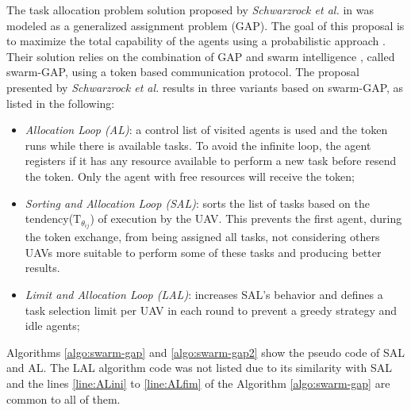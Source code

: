 The task allocation problem solution proposed by \textit{Schwarzrock et al.} in \cite{MAS07} was modeled as a generalized assignment problem (GAP)\cite{ferreira2007swarm}. The goal of this proposal is to maximize the total capability of the agents using a probabilistic approach \cite{theraulaz1998response}. Their solution relies on the combination of GAP and swarm intelligence \cite{MOEA07}, called swarm-GAP, using a token based communication protocol. The proposal presented by \textit{Schwarzrock et al.}\cite{MAS07} results in three variants based on swarm-GAP, as listed in the following:

\begin{itemize}
   \item \textit{Allocation Loop (AL)}: a control list of visited agents is used and the token runs while there is available tasks. To avoid the infinite loop, the agent registers if it has any resource available to perform a new task before resend the token. Only the agent with free resources will receive the token;
   \item \textit{Sorting and Allocation Loop (SAL)}: sorts the list of tasks based on the tendency($\textrm{T}_{\theta_{ij}}$) of execution by the UAV. This prevents the first agent, during the token exchange, from being assigned all tasks, not considering others UAVs more suitable to perform some of these tasks and producing better results. 
   \item \textit{Limit and Allocation Loop (LAL)}: increases SAL's behavior and defines a task selection limit per UAV in each round to prevent a greedy strategy and idle agents;
\end{itemize}

Algorithms \ref{algo:swarm-gap} and \ref{algo:swarm-gap2} show the pseudo code of SAL and AL. The LAL algorithm code was not listed due to its similarity with SAL and the lines \ref{line:ALini} to \ref{line:ALfim} of the Algorithm \ref{algo:swarm-gap} are common to all of them.

